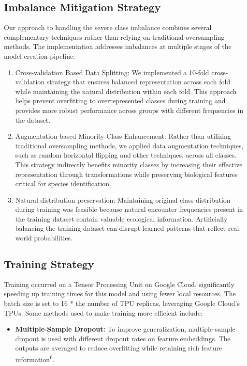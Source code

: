 \documentclass[twocolumn]{article}
\begin{document}
\subsection{Imbalance Mitigation Strategy}

Our approach to handling the severe class imbalance combines several complementary techniques rather than relying on traditional oversampling methods. The implementation addresses imbalances at multiple stages of the model creation pipeline:
\begin{enumerate}
\item Cross-validation Based Data Splitting: We implemented a 10-fold cross-validation strategy that ensures balanced representation across each fold while maintaining the natural distribution within each fold. This approach helps prevent overfitting to overrepresented classes during training and provides more robust performance across groups with different frequencies in the  dataset. 
\item Augmentation-based Minority Class Enhancement: Rather than utilizing traditional oversampling methods, we applied data augmentation techniques, such as random horizontal flipping and other techniques, across all classes. This strategy indirectly benefits minority classes by increasing their effective representation through transformations while preserving biological features critical for species identification.
\item Natural distribution preservation: Maintaining original class distribution during training was feasible because natural encounter frequencies present in the training dataset contain valuable ecological information. Artificially balancing the training dataset can disrupt learned patterns that reflect real-world probabilities. 
\end{enumerate}

\subsection{Training Strategy}

Training occurred on a Tensor Processing Unit on Google Cloud, significantly speeding up training times for this model and using fewer local resources. The batch size is set to 16 * the number of TPU replicas, leveraging Google Cloud’s TPUs. Some methods used to make training more efficient include:

\begin{itemize}
    \item \textbf{Multiple-Sample Dropout: }To improve generalization, multiple-sample dropout is used with different dropout rates on feature embeddings. The outputs are averaged to reduce overfitting while retaining rich feature information\textsuperscript{6}.
\end{itemize}
\end{document}
